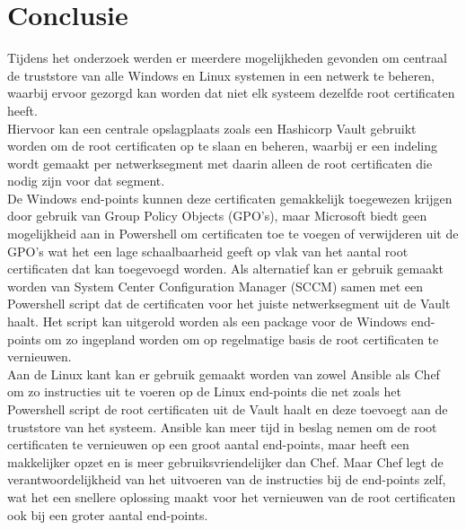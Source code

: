 
\chapter{Conclusie}%
\label{ch:conclusie}



Tijdens het onderzoek werden er meerdere mogelijkheden gevonden om centraal de truststore van alle Windows en Linux systemen in een netwerk te beheren, waarbij ervoor gezorgd kan worden dat niet elk systeem dezelfde root certificaten heeft. \\

Hiervoor kan een centrale opslagplaats zoals een Hashicorp Vault gebruikt worden om de root certificaten op te slaan en beheren, waarbij er een indeling wordt gemaakt per netwerksegment met daarin alleen de root certificaten die nodig zijn voor dat segment. \\

De Windows end-points kunnen deze certificaten gemakkelijk toegewezen krijgen door gebruik van Group Policy Objects (GPO's), maar Microsoft biedt geen mogelijkheid aan in Powershell om certificaten toe te voegen of verwijderen uit de GPO's wat het een lage schaalbaarheid geeft op vlak van het aantal root certificaten dat kan toegevoegd worden.
Als alternatief kan er gebruik gemaakt worden van System Center Configuration Manager (SCCM) samen met een Powershell script dat de certificaten voor het juiste netwerksegment uit de Vault haalt. Het script kan uitgerold worden als een package voor de Windows end-points om zo ingepland worden om op regelmatige basis de root certificaten te vernieuwen. \\

Aan de Linux kant kan er gebruik gemaakt worden van zowel Ansible als Chef om zo instructies uit te voeren op de Linux end-points die net zoals het Powershell script de root certificaten uit de Vault haalt en deze toevoegt aan de truststore van het systeem. 
Ansible kan meer tijd in beslag nemen om de root certificaten te vernieuwen op een groot aantal end-points, maar heeft een makkelijker opzet en is meer gebruiksvriendelijker dan Chef. 
Maar Chef legt de verantwoordelijkheid van het uitvoeren van de instructies bij de end-points zelf, wat het een snellere oplossing maakt voor het vernieuwen van de root certificaten ook bij een groter aantal end-points. \\

